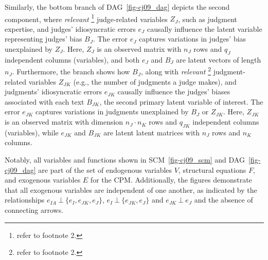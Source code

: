 \documentclass[
  authoryear,
  review,
  1p]{elsarticle}
\begin{document}
Similarly, the bottom branch of DAG~\ref{fig-cj09_dag} depicts the
second component, where \emph{relevant} \footnote{refer to footnote 2.}
judge-related variables \(Z_{J}\), such as judgment expertise, and
judges' idiosyncratic errors \(e_{J}\) causally influence the latent
variable representing judges' bias \(B_{J}\). The error \(e_{J}\)
captures variations in judges' bias unexplained by \(Z_{J}\). Here,
\(Z_{J}\) is an observed matrix with \(n_{J}\) rows and \(q_{J}\)
independent columns (variables), and both \(e_{J}\) and \(B_{J}\) are
latent vectors of length \(n_{J}\). Furthermore, the branch shows how
\(B_{J}\), along with \emph{relevant} \footnote{refer to footnote 2.}
judgment-related variables \(Z_{JK}\) (e.g., the number of judgments a
judge makes), and judgments' idiosyncratic errors \(e_{JK}\) causally
influence the judges' biases associated with each text \(B_{JK}\), the
second primary latent variable of interest. The error \(e_{JK}\)
captures variations in judgments unexplained by \(B_{J}\) or \(Z_{JK}\).
Here, \(Z_{JK}\) is an observed matrix with dimension
\(n_{J} \cdot n_{K}\) rows and \(q_{JK}\) independent columns
(variables), while \(e_{JK}\) and \(B_{JK}\) are latent latent matrices
with \(n_{J}\) rows and \(n_{K}\) columns.

Notably, all variables and functions shown in SCM~\ref{fig-cj09_scm} and
DAG~\ref{fig-cj09_dag} are part of the set of endogenous variables
\(V\), structural equations \(F\), and exogenous variables \(E\) for the
CPM. Additionally, the figures demonstrate that all exogenous variables
are independent of one another, as indicated by the relationships
\(e_{IA} \:\bot\:\{ e_{I}, e_{JK}, e_{J} \}\),
\(e_{I} \:\bot\:\{ e_{JK}, e_{J} \}\) and \(e_{JK} \:\bot\:e_{J}\) and
the absence of connecting arrows.
\end{document}
